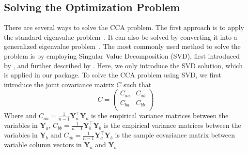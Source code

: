 \subsection{Solving the Optimization Problem}
There are several ways to solve the CCA problem. The first approach is to apply the standard eigenvalue problem~\citep{HOTELLING1936cca2,hooper1959ccaeigen}. It can also be solved by converting it into a generalized eigenvalue problem~\citep{bach2002kernel,hardoon2004canonical}. The most commonly used method to solve the problem is by employing Singular Value Decomposition (SVD), first introduced by \cite{healy1957ccasvd}, and further described by \cite{ewerbring1989canonical}. Here, we only introduce the SVD solution, which is applied in our package.
To solve the CCA problem using SVD, we first introduce the joint covariance matrix $C$ such that
\begin{equation}
	C = \begin{pmatrix}
		C_{aa} & C_{ab}\\
		C_{ba} & C_{bb}\\
	\end{pmatrix}
\end{equation}
Where  and $C_{aa} = \frac{1}{n-1} \mathbf{Y}_a^\top \mathbf{Y}_a$ is the empirical variance matrices between the variables in $\mathbf{Y}_a$, $C_{bb} = \frac{1}{n-1} \mathbf{Y}_b^\top \mathbf{Y}_b$ is the empirical variance matrices between the variables in $\mathbf{Y}_b$ and $C_{ab} = \frac{1}{n-1} \mathbf{Y}_a^\top \mathbf{Y}_b$ is the sample covariance matrix between variable column vectors in $\mathbf{Y}_a$ and $\mathbf{Y}_b$

